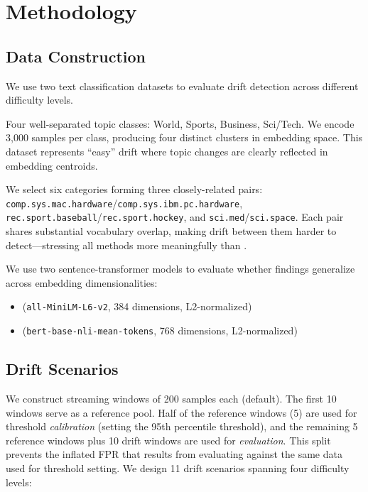 \section{Methodology}
\label{sec:method}

\subsection{Data Construction}
\label{sec:data}

We use two text classification datasets to evaluate drift detection across different difficulty levels.

Four well-separated topic classes: World, Sports, Business, Sci/Tech. We encode 3{,}000 samples per class, producing four distinct clusters in embedding space. This dataset represents ``easy'' drift where topic changes are clearly reflected in embedding centroids.

We select six categories forming three closely-related pairs: \texttt{comp.sys.mac.hardware}/\texttt{comp.sys.ibm.pc.hardware}, \texttt{rec.sport.baseball}/\texttt{rec.sport.hockey}, and \texttt{sci.med}/\texttt{sci.space}. Each pair shares substantial vocabulary overlap, making drift between them harder to detect---stressing all methods more meaningfully than \agnews.

We use two sentence-transformer models to evaluate whether findings generalize across embedding dimensionalities:
\begin{itemize}[leftmargin=*,itemsep=2pt,topsep=2pt]
    \item \minilm (\texttt{all-MiniLM-L6-v2}, 384 dimensions, L2-normalized)
    \item \bertbase (\texttt{bert-base-nli-mean-tokens}, 768 dimensions, L2-normalized)
\end{itemize}

\subsection{Drift Scenarios}
\label{sec:scenarios}

We construct streaming windows of 200 samples each (default). The first 10 windows serve as a reference pool. Half of the reference windows (5) are used for threshold \emph{calibration} (setting the 95th percentile threshold), and the remaining 5 reference windows plus 10 drift windows are used for \emph{evaluation}. This split prevents the inflated FPR that results from evaluating against the same data used for threshold setting. We design 11 drift scenarios spanning four difficulty levels:

